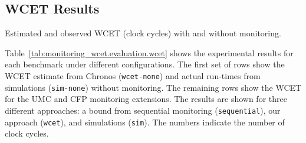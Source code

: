 \subsection{WCET Results}

\begin{table}
  \begin{center}
    \begin{scriptsize}
    
    \end{scriptsize}
    \caption{Estimated and observed WCET (clock cycles) with and without monitoring.}
    \label{tab:monitoring_wcet.evaluation.wcet}
  \end{center}
\end{table}

Table~\ref{tab:monitoring_wcet.evaluation.wcet} shows the experimental results
for each benchmark under different configurations. The first set of rows show
the WCET estimate from Chronos ({\tt wcet-none}) and actual run-times from
simulations ({\tt sim-none}) without monitoring. The remaining rows show the
WCET for the UMC and CFP monitoring extensions. The results are shown for three
different approaches: a bound from sequential monitoring ({\tt sequential}),
our approach ({\tt wcet}), and simulations ({\tt sim}). The numbers indicate
the number of clock cycles.

%     

